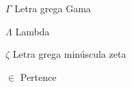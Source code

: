 \documentclass[
	12pt,				%
	oneside,			%
	a4paper,			%
	english,			%
	brazil				%
	]{abntex2ppgsi}
\begin{document}
%
%

%
% 
\begin{simbolos}
  \item[$ \Gamma $] Letra grega Gama
  \item[$ \Lambda $] Lambda
  \item[$ \zeta $] Letra grega minúscula zeta
  \item[$ \in $] Pertence
\end{simbolos}
\end{document}
